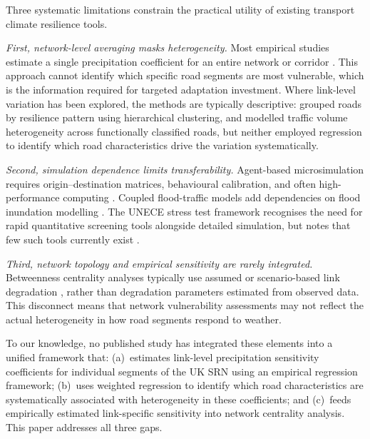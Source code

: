 \documentclass[review]{elsarticle}
\begin{document}
Three systematic limitations constrain the practical utility of existing transport climate resilience tools.

\textit{First, network-level averaging masks heterogeneity.} Most empirical studies estimate a single precipitation coefficient for an entire network or corridor \citep{hranac2006empirical,koetse2009impact,bi2022weather}. This approach cannot identify which specific road segments are most vulnerable, which is the information required for targeted adaptation investment. Where link-level variation has been explored, the methods are typically descriptive: \citet{gao2024resilience} grouped roads by resilience pattern using hierarchical clustering, and \citet{pulugurtha2021aadt} modelled traffic volume heterogeneity across functionally classified roads, but neither employed regression to identify which road characteristics drive the variation systematically.

\textit{Second, simulation dependence limits transferability.} Agent-based microsimulation requires origin--destination matrices, behavioural calibration, and often high-performance computing \citep{huang2022overview}. Coupled flood-traffic models add dependencies on flood inundation modelling \citep{pregnolato2017depth,pregnolato2016impact,he2026flood}. The UNECE stress test framework recognises the need for rapid quantitative screening tools alongside detailed simulation, but notes that few such tools currently exist \citep{unece2024stress}.

\textit{Third, network topology and empirical sensitivity are rarely integrated.} Betweenness centrality analyses typically use assumed or scenario-based link degradation \citep{wassmer2024resilience,stamos2023centrality}, rather than degradation parameters estimated from observed data. This disconnect means that network vulnerability assessments may not reflect the actual heterogeneity in how road segments respond to weather.

To our knowledge, no published study has integrated these elements into a unified framework that: (a)~estimates link-level precipitation sensitivity coefficients for individual segments of the UK SRN using an empirical regression framework; (b)~uses weighted regression to identify which road characteristics are systematically associated with heterogeneity in these coefficients; and (c)~feeds empirically estimated link-specific sensitivity into network centrality analysis. This paper addresses all three gaps.


\end{document}
